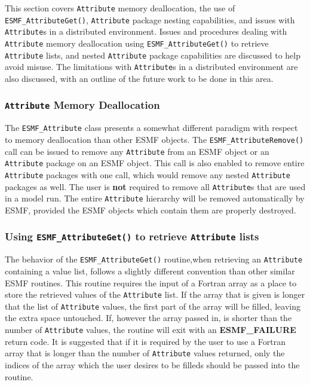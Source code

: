 %

This section covers {\tt Attribute} memory deallocation, the use of {\tt ESMF\_AttributeGet()}, {\tt Attribute} package nesting capabilities, and issues with {\tt Attribute}s in a distributed environment.  Issues and procedures dealing with {\tt Attribute} memory deallocation using {\tt ESMF\_AttributeGet()} to retrieve {\tt Attribute} lists, and nested {\tt Attribute} package capabilities are discussed to help avoid misuse.  The limitations with {\tt Attribute}s in a distributed environment are also discussed, with an outline of the future work to be done in this area. 

\subsubsection{{\tt Attribute} Memory Deallocation}

The {\tt ESMF\_Attribute} class presents a somewhat different paradigm with respect to memory deallocation than other ESMF objects.  The {\tt ESMF\_AttributeRemove()} call can be issued to remove any {\tt Attribute} from an ESMF object or an {\tt Attribute} package on an ESMF object.  This call is also enabled to remove entire {\tt Attribute} packages with one call, which would remove any nested {\tt Attribute} packages as well.  The user is {\bf not} required to remove all {\tt Attribute}s that are used in a model run.  The entire {\tt Attribute} hierarchy will be removed automatically by ESMF, provided the ESMF objects which contain them are properly destroyed.  

\subsubsection{Using {\tt ESMF\_AttributeGet()} to retrieve {\tt Attribute} lists}

The behavior of the {\tt ESMF\_AttributeGet()} routine,when retrieving an {\tt Attribute} containing a value list, follows a slightly different convention than other similar ESMF routines.  This routine requires the input of a Fortran array as a place to store the retrieved values of the {\tt Attribute} list.  If the array that is given is longer that the list of {\tt Attribute} values, the first part of the array will be filled, leaving the extra space untouched.  If, however the array passed in, is shorter than the number of {\tt Attribute} values, the routine will exit with an {\bf ESMF\_FAILURE} return code.  It is suggested that if it is required by the user to use a Fortran array that is longer than the number of {\tt Attribute} values returned, only the indices of the array which the user desires to be filleds should be passed into the routine.  
  
